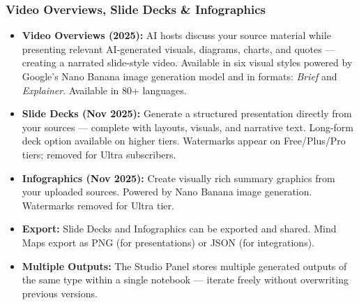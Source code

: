 \begin{frame}[fragile]\frametitle{Video Overviews, Slide Decks \& Infographics}
  \begin{itemize}
    \item \textbf{Video Overviews (2025):} AI hosts discuss your source material while presenting relevant AI-generated visuals, diagrams, charts, and quotes — creating a narrated slide-style video. Available in six visual styles powered by Google's Nano Banana image generation model and in formats: \textit{Brief} and \textit{Explainer}. Available in 80+ languages.
    \item \textbf{Slide Decks (Nov 2025):} Generate a structured presentation directly from your sources — complete with layouts, visuals, and narrative text. Long-form deck option available on higher tiers. Watermarks appear on Free/Plus/Pro tiers; removed for Ultra subscribers.
    \item \textbf{Infographics (Nov 2025):} Create visually rich summary graphics from your uploaded sources. Powered by Nano Banana image generation. Watermarks removed for Ultra tier.
    \item \textbf{Export:} Slide Decks and Infographics can be exported and shared. Mind Maps export as PNG (for presentations) or JSON (for integrations).
    \item \textbf{Multiple Outputs:} The Studio Panel stores multiple generated outputs of the same type within a single notebook — iterate freely without overwriting previous versions.
  \end{itemize}
\end{frame}

